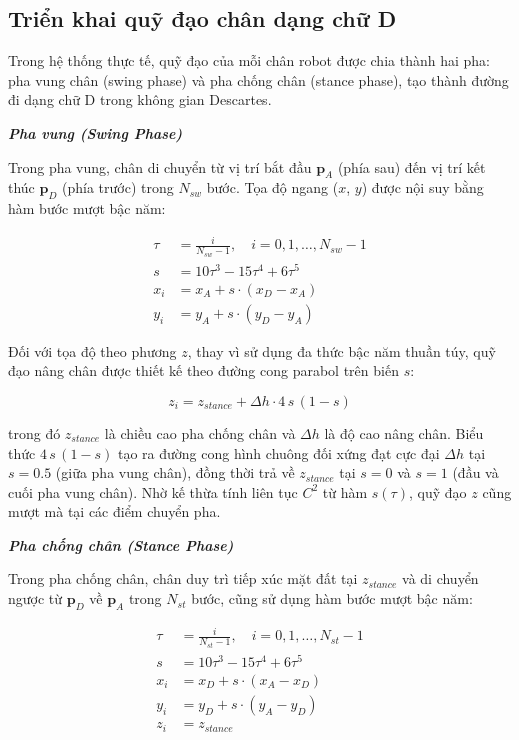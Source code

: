 \subsection{Triển khai quỹ đạo chân dạng chữ D}

Trong hệ thống thực tế, quỹ đạo của mỗi chân robot được chia thành hai pha: pha vung chân (swing phase) và pha chống chân (stance phase), tạo thành đường đi dạng chữ D trong không gian Descartes.

\textbf{\textit{Pha vung (Swing Phase)}} 

Trong pha vung, chân di chuyển từ vị trí bắt đầu $\mathbf{p}_A$ (phía sau) đến vị trí kết thúc $\mathbf{p}_D$ (phía trước) trong $N_{sw}$ bước. Tọa độ ngang ($x$, $y$) được nội suy bằng hàm bước mượt bậc năm:

\begin{align}
\tau &= \frac{i}{N_{sw} - 1}, \quad i = 0, 1, \ldots, N_{sw}-1 \\
s &= 10\tau^3 - 15\tau^4 + 6\tau^5 \\
x_i &= x_A + s \cdot (x_D - x_A) \\
y_i &= y_A + s \cdot (y_D - y_A)
\end{align}

Đối với tọa độ theo phương $z$, thay vì sử dụng đa thức bậc năm thuần túy, quỹ đạo nâng chân được thiết kế theo đường cong parabol trên biến $s$:

\begin{equation}
z_i = z_{stance} + \Delta h \cdot 4\,s\,(1 - s)
\label{eq:z_parabolic}
\end{equation}

trong đó $z_{stance}$ là chiều cao pha chống chân và $\Delta h$ là độ cao nâng chân. Biểu thức $4\,s\,(1-s)$ tạo ra đường cong hình chuông đối xứng đạt cực đại $\Delta h$ tại $s = 0.5$ (giữa pha vung chân), đồng thời trả về $z_{stance}$ tại $s = 0$ và $s = 1$ (đầu và cuối pha vung chân). Nhờ kế thừa tính liên tục $C^2$ từ hàm $s(\tau)$, quỹ đạo $z$ cũng mượt mà tại các điểm chuyển pha.

\textbf{\textit{Pha chống chân (Stance Phase)}} 

Trong pha chống chân, chân duy trì tiếp xúc mặt đất tại $z_{stance}$ và di chuyển ngược từ $\mathbf{p}_D$ về $\mathbf{p}_A$ trong $N_{st}$ bước, cũng sử dụng hàm bước mượt bậc năm:

\begin{align}
\tau &= \frac{i}{N_{st} - 1}, \quad i = 0, 1, \ldots, N_{st}-1 \\
s &= 10\tau^3 - 15\tau^4 + 6\tau^5 \\
x_i &= x_D + s \cdot (x_A - x_D) \\
y_i &= y_D + s \cdot (y_A - y_D) \\
z_i &= z_{stance}
\end{align}

